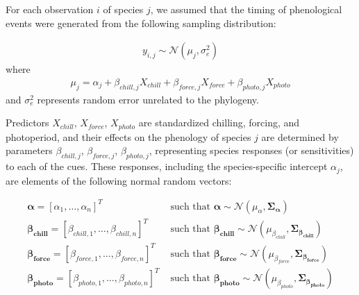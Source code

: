 \documentclass[11pt]{article}
\begin{document}
For each observation $i$ of species $j$, we assumed that the timing of phenological events were generated from the following sampling distribution:

\begin{align}
  \label{modely}
  y_{i,j} \sim \mathcal{N}(\mu_j, \sigma_e^2)
\end{align}
where
\begin{align}
  \label{modelmu}
  \mu_j = \alpha_j + \beta_{chill,j} X_{chill} + \beta_{force,j} X_{force} + \beta_{photo,j} X_{photo}
\end{align}
and $\sigma_e^2$ represents random error unrelated to the phylogeny. 

Predictors $X_{chill}$, $X_{force}$, $X_{photo}$ are standardized chilling, forcing, and photoperiod, and their effects on the phenology of species $j$ are determined by parameters $\beta_{chill,j}$, $\beta_{force,j}$, $\beta_{photo,j}$, representing species responses (or sensitivities) to each of the cues. These responses, including the species-specific intercept $\alpha_j$, are elements of the following normal random vectors:

\begin{align}
    \label{phybetas}
  \boldsymbol{\alpha} = [\alpha_1, \ldots, \alpha_n]^T & \text{ such that }
  \boldsymbol{\alpha} \sim \mathcal{N}(\mu_{\alpha},\boldsymbol{\Sigma_{\alpha}}) \\
  \boldsymbol{\beta_{chill}} =  [\beta_{chill,1}, \ldots, \beta_{chill,n}]^T & \text{ such that }
  \boldsymbol{\beta_{chill}} \sim \mathcal{N}(\mu_{\beta_{chill}},\boldsymbol{\Sigma_{\beta_{chill}}}) \nonumber \\
  \boldsymbol{\beta_{force}} =  [\beta_{force,1}, \ldots, \beta_{force,n}]^T & \text{ such that }
  \boldsymbol{\beta_{force}} \sim \mathcal{N}(\mu_{\beta_{force}},\boldsymbol{\Sigma_{\beta_{force}}}) \nonumber \\
  \boldsymbol{\beta_{photo}} =  [\beta_{photo,1}, \ldots, \beta_{photo,n}]^T & \text{ such that }
  \boldsymbol{\beta_{photo}} \sim \mathcal{N}(\mu_{\beta_{photo}},\boldsymbol{\Sigma_{\beta_{photo}}}) \nonumber
\end{align}
\end{document}
